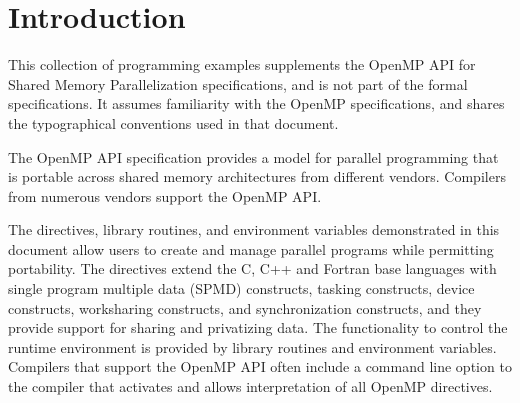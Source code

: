 %
%
%
%
%
%
%
%
%
%

\chapter*{Introduction}
\label{chap:introduction}
This collection of programming examples supplements the OpenMP API for Shared
Memory Parallelization specifications, and is not part of the formal specifications. It
assumes familiarity with the OpenMP specifications, and shares the typographical
conventions used in that document.

The OpenMP API specification provides a model for parallel programming that is
portable across shared memory architectures from different vendors. Compilers from
numerous vendors support the OpenMP API.

The directives, library routines, and environment variables demonstrated in this
document allow users to create and manage parallel programs while permitting
portability. The directives extend the C, C++ and Fortran base languages with single
program multiple data (SPMD) constructs, tasking constructs, device constructs,
worksharing constructs, and synchronization constructs, and they provide support for
sharing and privatizing data. The functionality to control the runtime environment is
provided by library routines and environment variables. Compilers that support the
OpenMP API often include a command line option to the compiler that activates and
allows interpretation of all OpenMP directives.

